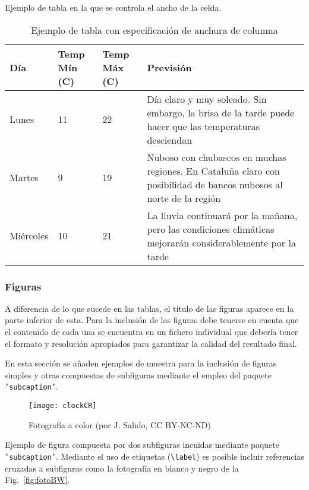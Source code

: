 \noindent Ejemplo de tabla en la que se 
controla el ancho de la celda.

\begin{table}[hbt]%
	\centering
	\caption{Ejemplo de tabla con especificación de anchura de columna}
	\label{tab:anchura}
	\begin{tabular}{ | l | l | l | p{5cm} |}
		\hline
		Día & Temp Mín (\textdegree C) & Temp Máx (\textdegree C) & Previsión \\ \hline
		Lunes & 11 & 22 & Día claro y muy soleado. Sin embargo, la brisa de la tarde puede hacer que las temperaturas desciendan \\ \hline
		Martes & 9 & 19 & Nuboso con chubascos en muchas regiones. En Cataluña claro con posibilidad de bancos nubosos al norte de la región \\ \hline
		Miércoles & 10 & 21 & La lluvia continuará por la mañana, pero las 
		condiciones climáticas mejorarán considerablemente por la tarde\\
		\hline
	\end{tabular}
\end{table}






\clearpage
\subsubsection{Figuras}
A diferencia de lo que sucede en las tablas, el título de las figuras aparece en la parte inferior de esta. Para la inclusión de las figuras debe tenerse en cuenta que el contenido de cada una se encuentra en un fichero individual que debería tener el formato y resolución apropiados para garantizar la calidad del resultado final.

En esta sección se añaden ejemplos de muestra para la inclusión de 
figuras simples y otras compuestas de subfiguras mediante el empleo del paquete \texttt{`subcaption'}.

\begin{figure}[hbt]
	\centering
	\texttt{[image: clockCR]}
	\caption[Ejemplo de figura]{Fotografía a color 
	(por J. Salido, CC BY-NC-ND)}
	\label{fig:ejFigure}
\end{figure}


\noindent Ejemplo de figura compuesta por dos subfiguras incuidas mediante paquete \texttt{`subcaption'}. Mediante el uso de etiquetas (\texttt{\textbackslash label}) es posible incluir referencias cruzadas a subfiguras como la fotografía en blanco y negro de la Fig.~\ref{fig:fotoBW}.


